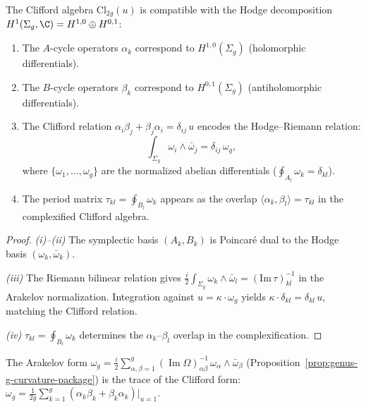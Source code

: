 \begin{proposition}
\label{prop:hodge-clifford}
The Clifford algebra $\mathrm{Cl}_{2g}(u)$ is compatible with the
Hodge decomposition $H^1(\Sigma_g, \C) = H^{1,0} \oplus H^{0,1}$:
\begin{enumerate}[label=\textup{(\roman*)}]
\item The $A$-cycle operators $\alpha_k$ correspond to
$H^{1,0}(\Sigma_g)$ (holomorphic differentials).

\item The $B$-cycle operators $\beta_k$ correspond to
$H^{0,1}(\Sigma_g)$ (antiholomorphic differentials).

\item The Clifford relation $\alpha_i \beta_j + \beta_j \alpha_i =
\delta_{ij}\, u$ encodes the Hodge--Riemann relation:
\[
\int_{\Sigma_g} \omega_i \wedge \bar\omega_j = \delta_{ij}\, \omega_g,
\]
where $\{\omega_1, \ldots, \omega_g\}$ are the normalized abelian
differentials ($\oint_{A_l}\omega_k = \delta_{kl}$).

\item The period matrix $\tau_{kl} = \oint_{B_l}\omega_k$ appears as
the overlap $\langle \alpha_k, \beta_l \rangle = \tau_{kl}$ in the
complexified Clifford algebra.
\end{enumerate}
\end{proposition}

\begin{proof}
\emph{(i)--(ii)} The symplectic basis $(A_k, B_k)$ is Poincar\'e dual
to the Hodge basis $(\omega_k, \bar\omega_k)$.

\emph{(iii)} The Riemann bilinear relation gives
$\frac{i}{2}\int_{\Sigma_g}\omega_k \wedge \bar\omega_l =
(\mathrm{Im}\,\tau)^{-1}_{kl}$ in the Arakelov normalization.
Integration against $u = \kappa \cdot \omega_g$ yields
$\kappa \cdot \delta_{kl} = \delta_{kl}\, u$, matching the
Clifford relation.

\emph{(iv)} $\tau_{kl} = \oint_{B_l}\omega_k$ determines the
$\alpha_k$--$\beta_l$ overlap in the complexification.
\end{proof}

\begin{remark}
\label{rem:g9-arakelov-clifford}
The Arakelov form $\omega_g = \frac{i}{2}\sum_{\alpha,\beta=1}^g
(\operatorname{Im}\Omega)^{-1}_{\alpha\beta}\,
\omega_\alpha \wedge \bar\omega_\beta$
(Proposition~\ref{prop:genus-g-curvature-package}) is the trace of the
Clifford form: $\omega_g = \frac{1}{2g}\sum_{k=1}^g
(\alpha_k\beta_k + \beta_k\alpha_k)|_{u=1}$.
\end{remark}

